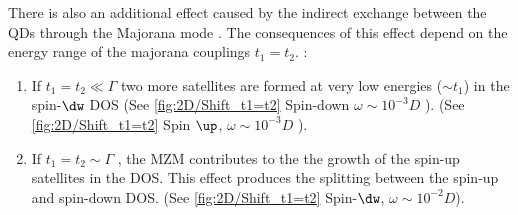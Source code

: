 There is also an additional effect caused by the indirect exchange between the QDs through the Majorana mode . The consequences of this effect depend on the energy range of the majorana couplings $t_1=t_2$.  : 
\begin{enumerate}
    \item If $t_1=t_2 \ll \Gamma $ two more satellites are formed at very low energies ($\sim t_1$) in the spin-$\dw$ DOS (See  \ref{fig:2D/Shift_t1=t2} Spin-down $\omega \sim 10^{-3}D$ ). (See  \ref{fig:2D/Shift_t1=t2} Spin $\up$, $\omega \sim 10^{-3}D$ ).
    \item If $t_1=t_2 \sim \Gamma$ , the MZM contributes to the the growth of the spin-up satellites in the DOS. This effect produces the splitting between the spin-up and spin-down DOS.   (See  \ref{fig:2D/Shift_t1=t2} Spin-$\dw$, $\omega \sim 10^{-2}D$).
\end{enumerate}




















